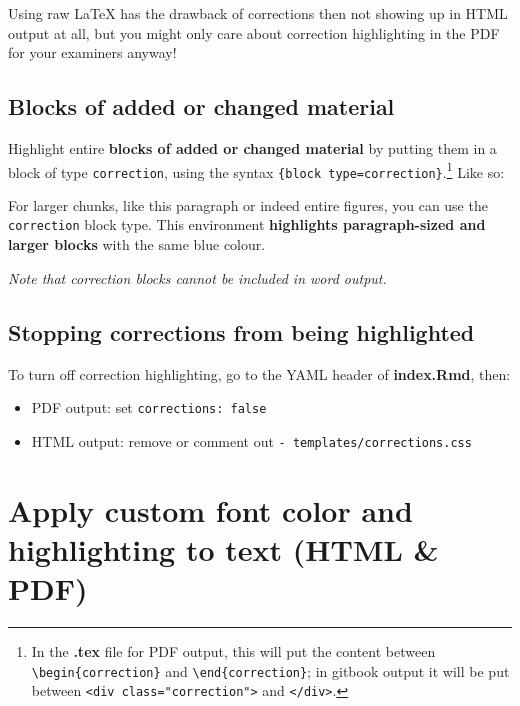 \documentclass[a4paper, twoside]{templates/ociamthesis}
\providecommand{\tightlist}{%
  \setlength{\itemsep}{0pt}\setlength{\parskip}{0pt}}
\begin{document}
Using raw LaTeX has the drawback of corrections then not showing up in HTML output at all, but you might only care about correction highlighting in the PDF for your examiners anyway!

\hypertarget{blocks-of-added-or-changed-material}{%
\subsection{Blocks of added or changed material}\label{blocks-of-added-or-changed-material}}

Highlight entire \textbf{blocks of added or changed material} by putting them in a block of type \texttt{correction}, using the syntax \texttt{\textasciigrave{}\textasciigrave{}\textasciigrave{}\{block\ type=\textquotesingle{}correction\textquotesingle{}\}}.\footnote{In the \textbf{.tex} file for PDF output, this will put the content between \texttt{\textbackslash{}begin\{correction\}} and \texttt{\textbackslash{}end\{correction\}}; in gitbook output it will be put between \texttt{\textless{}div\ class="correction"\textgreater{}} and \texttt{\textless{}/div\textgreater{}}.}
Like so:

\begin{correction}
For larger chunks, like this paragraph or indeed entire figures, you can
use the \texttt{correction} block type. This environment
\textbf{highlights paragraph-sized and larger blocks} with the same blue
colour.
\end{correction}

\emph{Note that correction blocks cannot be included in word output.}

\hypertarget{stopping-corrections-from-being-highlighted}{%
\subsection{Stopping corrections from being highlighted}\label{stopping-corrections-from-being-highlighted}}

To turn off correction highlighting, go to the YAML header of \textbf{index.Rmd}, then:

\begin{itemize}
\tightlist
\item
  PDF output: set \texttt{corrections:\ false}\\
\item
  HTML output: remove or comment out \texttt{-\ templates/corrections.css}
\end{itemize}

\hypertarget{apply-custom-font-color-and-highlighting-to-text-html-pdf}{%
\section{Apply custom font color and highlighting to text (HTML \& PDF)}\label{apply-custom-font-color-and-highlighting-to-text-html-pdf}}
\end{document}
